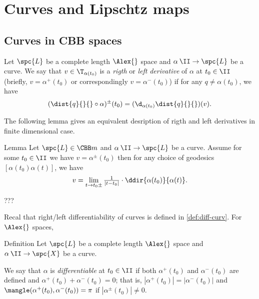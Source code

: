 \chapter{Curves and Lipschtz maps}


\section{Curves in CBB spaces}

Let
$\spc{L}$ be a complete length $\Alex{}$ space
and $\alpha\:\II\to \spc{L}$ be a curve.
We say that $v\in\T_{\alpha(t_0)}$ is a \emph{rigth} or \emph{left} \emph{derivative} of $\alpha$ at $t_0\in\II$ (briefly, $v=\alpha^+(t_0)$ or correspondingly $v=\alpha^-(t_0)$)
if 
for any $q\not=\alpha(t_0)$, we have
\[(\dist{q}{}{}\circ\alpha)^\pm(t_0)=(\d_{\alpha(t_0)}\dist{q}{}{})(v).\]



The following lemma gives an equivalent desription of rigth and left derivatives in finite dimensional case.


\begin{thm}{Lemma}
Let $\spc{L}\in\CBB m{}$ and $\alpha\:\II\to \spc{L}$ be a curve.
Assume for some $t_0\in \II$ we have $v=\alpha^\pm(t_0)$ then 
for any choice of geodesics $[\alpha(t_0)\alpha(t)]$, we have
\[v=\lim_{t\to t_0\pm}\tfrac{1}{|t-t_0|}\cdot\ddir{\alpha(t_0)}{\alpha(t)}.\]

\end{thm}

???
\qeds

Recal that right/left differentiability of curves is defined in \ref{def:diff-curv}.
For $\Alex{}$ spaces, 

\begin{thm}{Definition}\label{def:diff-curv-yet}
Let $\spc{L}$ be a complete length $\Alex{}$ space  
and $\alpha\:\II\to \spc{X}$ be a curve.

We say that $\alpha$ is \emph{differentiable} at $t_0\in\II$ if 
both $\alpha^+(t_0)$ and $\alpha^-(t_0)$ are defined and $\alpha^+(t_0)+\alpha^-(t_0)=0$; that is,  $|\alpha^+(t_0)|=|\alpha^-(t_0)|$ and 
$\mangle(\alpha^+(t_0),\alpha^-(t_0))=\pi$ if $|\alpha^\pm(t_0)|\ne 0$.
\end{thm}






